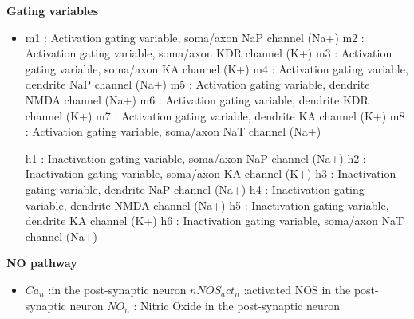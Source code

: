 \documentclass[fleqn]{report}
\numberwithin{equation}{section}
\numberwithin{equation}{section}
\newcommand{\Ca}{\text{Ca$^{2+}$}}
\begin{document}
				 
				          
				            
				             \textbf{Gating variables}
				             \begin{itemize}
				             \item  m1 : Activation gating variable, soma/axon NaP channel (Na+)
				             				            m2 : Activation gating variable, soma/axon KDR channel (K+)
				             				            m3 : Activation gating variable, soma/axon KA channel (K+)
				             				            m4 : Activation gating variable, dendrite NaP channel (Na+)
				             				            m5 : Activation gating variable, dendrite NMDA channel (Na+)
				             				            m6 : Activation gating variable, dendrite KDR channel (K+)
				             				            m7 : Activation gating variable, dendrite KA channel (K+)
				             				            m8 : Activation gating variable, soma/axon NaT channel (Na+)
				             				            
				             				            h1 : Inactivation gating variable, soma/axon NaP channel (Na+)
				             				            h2 : Inactivation gating variable, soma/axon KA channel (K+)
				             				            h3 : Inactivation gating variable, dendrite NaP channel (Na+)
				             				            h4 : Inactivation gating variable, dendrite NMDA channel (Na+)
				             				            h5 : Inactivation gating variable, dendrite KA channel (K+)
				             				            h6 : Inactivation gating variable, soma/axon NaT channel (Na+)
				             \end{itemize}
				           
				            
				            \textbf{NO pathway} 
				            \begin{itemize}
				            \item $Ca_n$ :\Ca in the post-synaptic neuron                  
				            				            $nNOS_act_n$ :activated NOS in the post-synaptic neuron
				            				            $NO_n$ : Nitric Oxide in the post-synaptic neuron
				            \end{itemize}
				            
\end{document}
